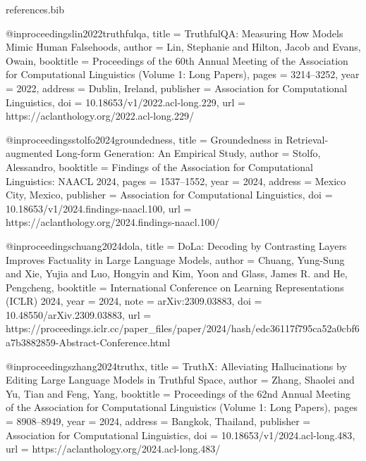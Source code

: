 
\begin{filecontents*}{references.bib}

@inproceedings{lin2022truthfulqa,
  title     = {TruthfulQA: Measuring How Models Mimic Human Falsehoods},
  author    = {Lin, Stephanie and Hilton, Jacob and Evans, Owain},
  booktitle = {Proceedings of the 60th Annual Meeting of the Association for Computational Linguistics (Volume 1: Long Papers)},
  pages     = {3214--3252},
  year      = {2022},
  address   = {Dublin, Ireland},
  publisher = {Association for Computational Linguistics},
  doi       = {10.18653/v1/2022.acl-long.229},
  url       = {https://aclanthology.org/2022.acl-long.229/}
}

@inproceedings{stolfo2024groundedness,
  title     = {Groundedness in Retrieval-augmented Long-form Generation: An Empirical Study},
  author    = {Stolfo, Alessandro},
  booktitle = {Findings of the Association for Computational Linguistics: NAACL 2024},
  pages     = {1537--1552},
  year      = {2024},
  address   = {Mexico City, Mexico},
  publisher = {Association for Computational Linguistics},
  doi       = {10.18653/v1/2024.findings-naacl.100},
  url       = {https://aclanthology.org/2024.findings-naacl.100/}
}

@inproceedings{chuang2024dola,
  title     = {DoLa: Decoding by Contrasting Layers Improves Factuality in Large Language Models},
  author    = {Chuang, Yung-Sung and Xie, Yujia and Luo, Hongyin and Kim, Yoon and Glass, James R. and He, Pengcheng},
  booktitle = {International Conference on Learning Representations (ICLR) 2024},
  year      = {2024},
  note      = {arXiv:2309.03883},
  doi       = {10.48550/arXiv.2309.03883},
  url       = {https://proceedings.iclr.cc/paper_files/paper/2024/hash/edc36117f795ca52a0cbf6a7b3882859-Abstract-Conference.html}
}

@inproceedings{zhang2024truthx,
  title     = {TruthX: Alleviating Hallucinations by Editing Large Language Models in Truthful Space},
  author    = {Zhang, Shaolei and Yu, Tian and Feng, Yang},
  booktitle = {Proceedings of the 62nd Annual Meeting of the Association for Computational Linguistics (Volume 1: Long Papers)},
  pages     = {8908--8949},
  year      = {2024},
  address   = {Bangkok, Thailand},
  publisher = {Association for Computational Linguistics},
  doi       = {10.18653/v1/2024.acl-long.483},
  url       = {https://aclanthology.org/2024.acl-long.483/}
}


\end{filecontents*}
